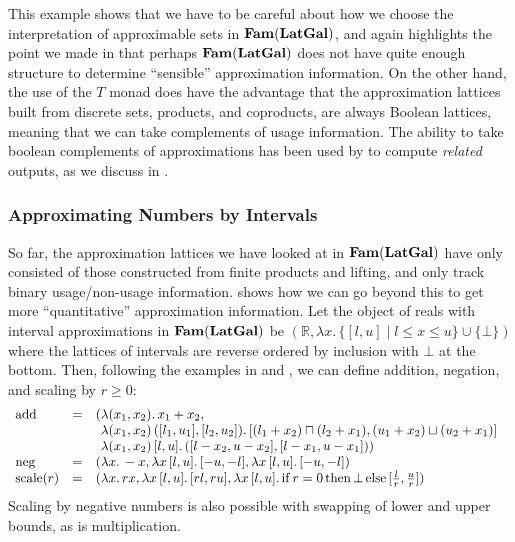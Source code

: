 This example shows that we have to be careful about how we choose the
interpretation of approximable sets in $\mathbf{Fam}(\mathbf{LatGal})$, and again
highlights the point we made in  that
perhaps $\mathbf{Fam}(\mathbf{LatGal})$ does not have quite enough structure to
determine ``sensible'' approximation information. On the other hand,
the use of the $T$ monad does have the advantage that the
approximation lattices built from discrete sets, products, and
coproducts, are always Boolean lattices, meaning that we can take
complements of usage information. The ability to take boolean
complements of approximations has been used by \citet{perera22} to
compute \emph{related} outputs, as we discuss in
.

\subsubsection{Approximating Numbers by Intervals}

So far, the approximation lattices we have looked at in
$\mathbf{Fam}(\mathbf{LatGal})$ have only consisted of those constructed from finite
products and lifting, and only track binary usage/non-usage
information.  shows how we can go
beyond this to get more ``quantitative'' approximation
information. Let the object of reals with interval approximations in
$\mathbf{Fam}(\mathbf{LatGal})$ be
$(\mathbb{R}, \lambda x.\,\{[l,u] \mid l \leq x \leq u\} \cup
\{\bot\})$ where the lattices of intervals are reverse ordered by
inclusion with $\bot$ at the bottom. Then, following the examples in
 and , we
can define addition, negation, and scaling by $r \geq 0$:
\begin{displaymath}
  \begin{array}{lcl}
    \mathrm{add}&=&(\begin{array}[t]{@{}l}
      \lambda (x_1,x_2).\,x_1+x_2, \\
      \lambda (x_1,x_2)\,([l_1,u_1],[l_2,u_2]).\,[(l_1+x_2) \sqcap (l_2+x_1),(u_1+x_2) \sqcup (u_2+x_1)] \\
      \lambda (x_1,x_2)\,[l,u].\,([l-x_2,u-x_2],[l-x_1,u-x_1]))
    \end{array}\\
    \mathrm{neg}&=&(\lambda x.\,-x, \lambda x\,[l,u].\,[-u,-l], \lambda x\,[l,u].\,[-u,-l]) \\
    \mathrm{scale}(r)&=&(\lambda x.\,rx, \lambda x\,[l,u].\,[rl,ru], \lambda x\,[l,u].\,\mathrm{if}\,r=0\,\mathrm{then}\,\bot\,\mathrm{else}\,[\frac{l}{r},\frac{u}{r}])
  \end{array}
\end{displaymath}
Scaling by negative numbers is also possible with swapping of lower
and upper bounds, as is multiplication.

